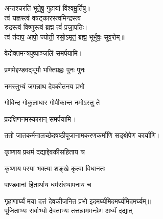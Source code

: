 \begin{center}
अन्तश्चरति॑ भूते॒षु॒ गुहायां वि॑श्वमू॒र्तिषु। \\
त्वं यज्ञस्त्वं वषट्कारस्त्वमिन्द्रस्त्व\\ रुद्रस्त्वं विष्णुस्त्वं ब्रह्म त्वं॑ प्रजा॒पतिः। \\
त्वं त॑दाप॒ आपो॒ ज्योती॒ रसो॒ऽमृतं॒ ब्रह्म॒ भूर्भुवः॒ सुव॒रोम्‌॥\medskip

\devAya{} वेदोक्तमन्त्रपुष्पाञ्जलिं समर्पयामि।\medskip

{प्रणमेद्दण्डवद्भूमौ भक्तिप्रह्वः पुनः पुनः}
\medskip

{नमस्तुभ्यं जगन्नाथ देवकीतनय प्रभो}

{गोविन्द गोकुलाधार गोपीकान्त नमोऽस्तु ते}

\devAya{} प्रदक्षिणनमस्कारान् समर्पयामि।
\medskip





ततो जातकर्मनालच्छेदषष्ठीपूजानामकरणकर्माणि सङ्क्षेपेण कार्याणि।


{कृष्णाय प्रथमं दद्याद्देवकीसहिताय च}

{कृष्णाय परया भक्त्या शङ्खे कृत्वा विधानतः}
\medskip

{पाण्डवानां हितार्थाय धर्मसंस्थापनाय च}

{गृहाणार्घ्यं मया दत्तं देवकीजनित प्रभो}
\devAya{} इदमर्घ्यमिदमर्घ्यमिदमर्घ्यम्॥\medskip
\medskip\\
पूजिताभ्यः सर्वाभ्यो देवताभ्यः तत्तन्नाममन्त्रेण अर्घ्यं दद्यात् \\


\end{center}
